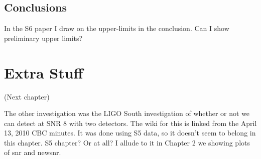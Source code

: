 \subsection{Conclusions}

In the S6 paper I draw on the upper-limits in the conclusion. Can I show preliminary upper limits?

\section{Extra Stuff}

(Next chapter)

The other investigation was the LIGO South investigation of whether or not we can detect at SNR 8 with two detectors. The wiki for this is linked from the April 13, 2010 CBC minutes. It was done using S5 data, so it doesn't seem to belong in this chapter. S5 chapter? Or at all? I allude to it in Chapter 2 we showing plots of snr and newsnr.

